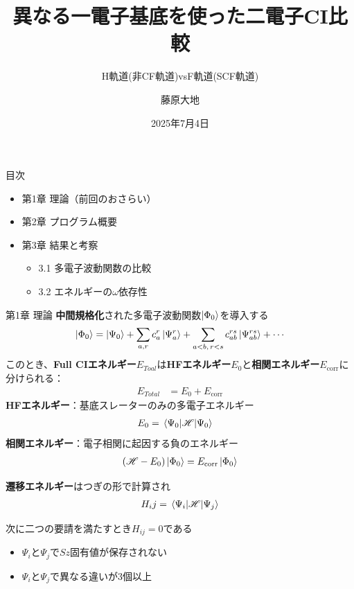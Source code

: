 \documentclass{beamer}
\title{異なる一電子基底を使った二電子CI比較}
\subtitle{H軌道(非CF軌道)vsF軌道(SCF軌道)}
\author{藤原大地}
\date{2025年7月4日}
\begin{document}
\frame{\titlepage}


  
\begin{frame}{目次}
  \begin{itemize}
    \item 第1章 理論（前回のおさらい）
    \item 第2章 プログラム概要
    \item 第3章 結果と考察
    \begin{itemize}
      \item 3.1 多電子波動関数の比較
      \item 3.2 エネルギーの$\omega$依存性
    \end{itemize}
  \end{itemize}
\end{frame}
  
\begin{frame}{第1章 理論}
\textbf{中間規格化}された多電子波動関数$\ket{\Phi_0}$を導入する
  \begin{align*}
  \ket{ \Phi_0} = \ket{\Psi_0}+ \sum_{a, r} c_a^r \ket{\Psi_a^r} + \sum_{a < b,\, r < s} c_{ab}^{rs} \ket{\Psi_{ab}^{rs}} + \cdots
  \end{align*}
  このとき、\textbf{Full CIエネルギー}$E_{Toal}$は\textbf{HFエネルギー}$E_0$と\textbf{相関エネルギー}$E_{\mathrm{corr}}$に分けられる：
  \begin{align*}
  E_{Total} &= E_0 + E_{\mathrm{corr}} 
  \end{align*}
  \textbf{HFエネルギー}：基底スレーターのみの多電子エネルギー
  \begin{align*}
  E_0 &= \mel{\Psi_0}{\mathscr{H}}{\Psi_0}
  \end{align*}
  \textbf{相関エネルギー}：電子相関に起因する負のエネルギー
  \begin{align*}
  (\mathscr{H} - E_0)\ket{\Phi_0} = E_{\mathrm{corr}} \ket{\Phi_0} 
  \end{align*}



\end{frame}
\begin{frame}{}
  \textbf{遷移エネルギー}はつぎの形で計算され
\begin{align*}
  H_ij = \mel{\Psi_i}{\mathscr{H}}{\Psi_{j}}
  \end{align*}

  次に二つの要請を満たすとき$H_{ij}=0$である
  \begin{itemize}
    \item ${\Psi_i}$と${\Psi_{j}}$で$Sz$固有値が保存されない
  \item ${\Psi_i}$と${\Psi_{j}}$で異なる違いが3個以上
  \end{itemize}


\end{frame}
\end{document}
